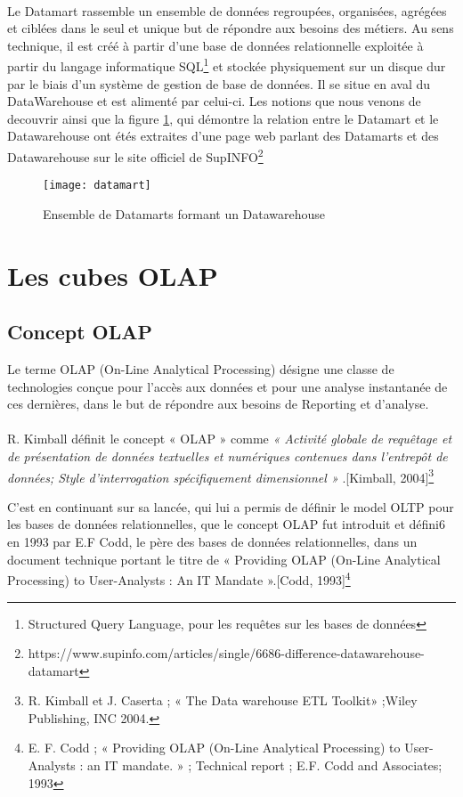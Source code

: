 \paragraph{}
Le Datamart rassemble un ensemble de données regroupées, organisées, agrégées et ciblées dans le seul et unique but de répondre aux besoins des métiers. Au sens technique, il est créé à partir d’une base de données relationnelle exploitée à partir du langage informatique SQL\footnote{Structured Query Language, pour les requêtes sur les bases de données} et stockée physiquement sur un disque dur par le biais d’un système de gestion de base de données. Il se situe en aval du DataWarehouse et est alimenté par celui-ci. Les notions que nous venons de decouvrir ainsi que la figure \ref{fig:datamart}, qui démontre la relation entre le Datamart et le Datawarehouse ont étés extraites d'une page web parlant des Datamarts et des Datawarehouse sur le site officiel de SupINFO\footnote{https://www.supinfo.com/articles/single/6686-difference-datawarehouse-datamart}
\begin{figure}[H]
    \centering
    \texttt{[image: datamart]}
    \caption{Ensemble de Datamarts formant un Datawarehouse}
    \label{fig:datamart}
\end{figure}


\section{Les cubes OLAP}

\subsection{Concept OLAP}
Le terme OLAP (On-Line Analytical Processing) désigne une classe de technologies conçue pour l’accès aux données et pour une analyse instantanée de ces dernières, dans le but de répondre aux besoins de Reporting et d’analyse.
\paragraph{}
R. Kimball définit le concept « OLAP » comme \textit{« Activité globale de requêtage et de
présentation de données textuelles et numériques contenues dans l’entrepôt de données; Style
d’interrogation spécifiquement dimensionnel » }.[Kimball, 2004]\footnote{R. Kimball et J. Caserta ; « The Data warehouse ETL Toolkit» ;Wiley
Publishing, INC 2004.}

C’est en continuant sur sa lancée, qui lui a permis de définir le model OLTP pour les bases de données relationnelles, que le concept OLAP fut introduit et défini6 en 1993 par E.F Codd, le père des bases de données relationnelles, dans un document technique portant le titre de « Providing OLAP (On-Line Analytical Processing) to User-Analysts : An IT Mandate ».[Codd, 1993]\footnote{E. F. Codd ; « Providing OLAP (On-Line Analytical Processing) to User-Analysts : an IT mandate. » ; Technical report ; E.F. Codd and Associates; 1993}

